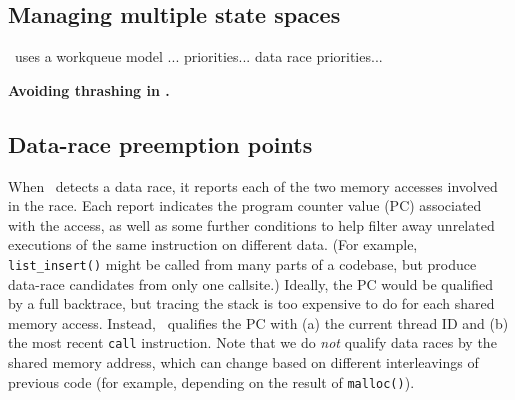\subsection{Managing multiple state spaces}

\quicksand~uses a workqueue model
...
priorities... data race priorities...



{\bf Avoiding thrashing in \quicksand.} %


\subsection{Data-race preemption points}


When \landslide~detects a data race, it reports each of the two memory accesses involved in the race.
Each report indicates the program counter value (PC) associated with the access, as well as some further conditions to help filter away unrelated executions of the same instruction on different data.
(For example, {\tt list\_insert()} might be called from many parts of a codebase, but produce data-race candidates from only one callsite.)
Ideally, the PC would be qualified by a full backtrace, but tracing the stack is too expensive to do for each shared memory access.
Instead, \landslide~qualifies the PC with
(a) the current thread ID and
(b) the most recent {\tt call} instruction.
Note that we do {\em not} qualify data races by the shared memory address,
which can change based on different interleavings of previous code
(for example, depending on the result of {\tt malloc()}).


